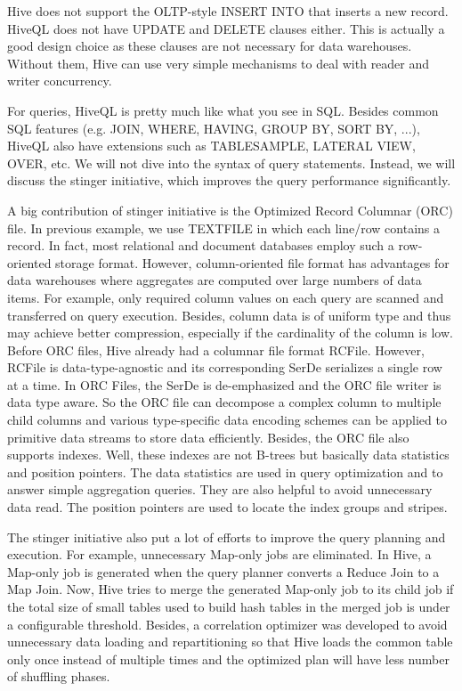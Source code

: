 \documentclass[11pt]{book}
\begin{document}
Hive does not support the OLTP-style INSERT INTO that inserts a new record. HiveQL does not have UPDATE and DELETE clauses either. This is actually a good design choice as these clauses are not necessary for data warehouses. Without them, Hive can use very simple mechanisms to deal with reader and writer concurrency.

For queries, HiveQL is pretty much like what you see in SQL. Besides common SQL features (e.g. JOIN, WHERE, HAVING, GROUP BY, SORT BY, ...), HiveQL also have extensions such as TABLESAMPLE, LATERAL VIEW, OVER, etc. We will not dive into the syntax of query statements. Instead, we will discuss the stinger initiative, which improves the query performance significantly.

A big contribution of stinger initiative is the Optimized Record Columnar (ORC) file. In previous example, we use TEXTFILE in which each line/row contains a record. In fact, most relational and document databases employ such a row-oriented storage format. However, column-oriented file format has advantages for data warehouses where aggregates are computed over large numbers of data items. For example, only required column values on each query are scanned and transferred on query execution. Besides, column data is of uniform type and thus may achieve better compression, especially if the cardinality of the column is low. Before ORC files, Hive already had a columnar file format RCFile. However, RCFile is data-type-agnostic and its corresponding SerDe serializes a single row at a time. In ORC Files, the SerDe is de-emphasized and the ORC file writer is data type aware. So the ORC file can decompose a complex column to multiple child columns and various type-specific data encoding schemes can be applied to primitive data streams to store data efficiently. Besides, the ORC file also supports indexes. Well, these indexes are not B-trees but basically data statistics and position pointers. The data statistics are used in query optimization and to answer simple aggregation queries. They are also helpful to avoid unnecessary data read. The position pointers are used to locate the index groups and stripes.

The stinger initiative also put a lot of efforts to improve the query planning and execution. For example, unnecessary Map-only jobs are eliminated. In Hive, a Map-only job is generated when the query planner converts a Reduce Join to a Map Join. Now, Hive tries to merge the generated Map-only job to its child job if the total size of small tables used to build hash tables in the merged job is under a configurable threshold. Besides, a correlation optimizer was developed to avoid unnecessary data loading and repartitioning so that Hive loads the common table only once instead of multiple times and the optimized plan will have less number of shuffling phases.
\end{document}
